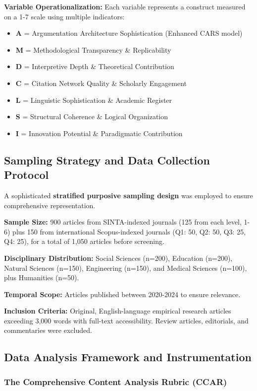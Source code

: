 \documentclass[journal,article,submit,pdftex,moreauthors]{Definitions/mdpi}
\begin{document}
\textbf{Variable Operationalization:} Each variable represents a construct measured on a 1-7 scale using multiple indicators:
\begin{itemize}
\item \textbf{A} = Argumentation Architecture Sophistication (Enhanced CARS model)
\item \textbf{M} = Methodological Transparency \& Replicability 
\item \textbf{D} = Interpretive Depth \& Theoretical Contribution
\item \textbf{C} = Citation Network Quality \& Scholarly Engagement
\item \textbf{L} = Linguistic Sophistication \& Academic Register
\item \textbf{S} = Structural Coherence \& Logical Organization
\item \textbf{I} = Innovation Potential \& Paradigmatic Contribution
\end{itemize}

\subsection{Sampling Strategy and Data Collection Protocol}

A sophisticated \textbf{stratified purposive sampling design} was employed to ensure comprehensive representation.

\textbf{Sample Size:} 900 articles from SINTA-indexed journals (125 from each level, 1-6) plus 150 from international Scopus-indexed journals (Q1: 50, Q2: 50, Q3: 25, Q4: 25), for a total of 1,050 articles before screening.

\textbf{Disciplinary Distribution:} Social Sciences (n=200), Education (n=200), Natural Sciences (n=150), Engineering (n=150), and Medical Sciences (n=100), plus Humanities (n=50).

\textbf{Temporal Scope:} Articles published between 2020-2024 to ensure relevance.

\textbf{Inclusion Criteria:} Original, English-language empirical research articles exceeding 3,000 words with full-text accessibility. Review articles, editorials, and commentaries were excluded.

\subsection{Data Analysis Framework and Instrumentation}

\subsubsection{The Comprehensive Content Analysis Rubric (CCAR)}
\end{document}
